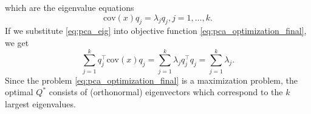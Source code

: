 which are the eigenvalue equations
\begin{equation}
    \text{cov}(x)q_j=\lambda_j q_j, j=1,\dots,k.
    \label{eq:pca_eig}
\end{equation}
If we substitute \eqref{eq:pca_eig} into objective function \eqref{eq:pca_optimization_final}, we get
\begin{equation}
    \sum_{j=1}^k q_j^{\top} \text{cov}(x)q_j = \sum_{j=1}^k \lambda_j q_j^{\top}q_j = \sum_{j=1}^k \lambda_j.
\end{equation}
Since the problem \eqref{eq:pca_optimization_final} is a maximization problem, the optimal $Q^*$ consists of (orthonormal) eigenvectors which correspond to the $k$ largest eigenvalues.
